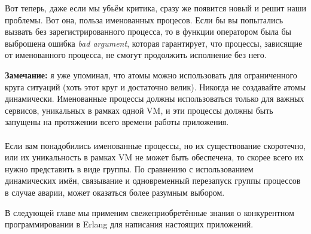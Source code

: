 Вот теперь, даже если мы убьём критика, сразу же появится новый и решит наши проблемы.
Вот она, польза именованных процесов.
Если бы вы попытались вызвать  без зарегистрированного процесса, то в функции оператором \ops{!} была бы выброшена ошибка \emph{bad argument}, которая гарантирует, что процессы, зависящие от именованного процесса, не смогут продолжить исполнение без него.\\
\colorbox{lgray}
{
\begin{minipage}{1.0\linewidth}
    \textbf{Замечание:} я уже упоминал, что атомы можно использовать для ограниченного круга ситуаций (хоть этот круг и достаточно велик).
Никогда не создавайте атомы динамически.
Именованные процессы должны использоваться только для важных сервисов, уникальных в рамках одной VM, и эти процессы должны быть запущены на протяжении всего времени работы приложения.\\
\\
Если вам понадобились именованные процессы, но их существование скоротечно, или их уникальность в рамках VM не может быть обеспечена, то скорее всего их нужно представить в виде группы.
По сравнению с использованием динамических имён, связывание и одновременный перезапуск группы процессов в случае аварии, может оказаться более разумным выбором.
\end{minipage}
}

В следующей главе мы применим свежеприобретённые знания о конкурентном программировании в Erlang для написания настоящих приложений.
